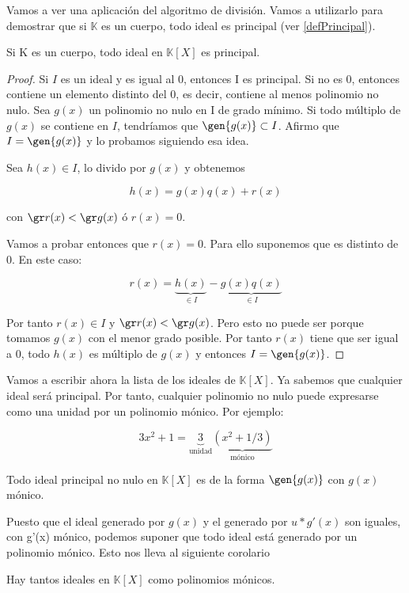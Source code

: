 \documentclass[nochap]{apuntes}
\begin{document}
Vamos a ver una aplicación del algoritmo de división. Vamos a utilizarlo para demostrar que si $\mathbb{K}$  es un cuerpo, todo ideal es principal (ver \ref{defPrincipal}).

\begin{theorem}
 Si K es un cuerpo, todo ideal en $\mathbb{K}[X]$ es principal.
\end{theorem}

\begin{proof}
  Si $I$ es un ideal y es igual al 0, entonces I es principal. Si no es 0, entonces contiene un elemento distinto del 0, es decir, contiene al menos polinomio no nulo. Sea $g(x)$ un polinomio no nulo en I de grado mínimo. Si todo múltiplo de $g(x)$ se contiene en $I$, tendríamos que $\gen{g(x)} \subset I$. Afirmo que $I=\gen{g(x)}$ y lo probamos siguiendo esa idea.

 Sea $h(x)\in I$, lo divido por $g(x)$ y obtenemos

 \[ h(x)=g(x)q(x)+r(x) \]

 con $\gr r(x) < \gr g(x)$ ó $r(x)=0$.

 Vamos a probar entonces que $r(x)=0$. Para ello suponemos que es distinto de 0. En este caso:

 \[ r(x)=\underbrace{h(x)}_{\in I}-\underbrace{g(x)q(x)}_{\in I} \]

 Por tanto $r(x)\in I$ y $\gr r(x) < \gr g(x)$. Pero esto no puede ser porque tomamos $g(x)$ con el menor grado posible. Por tanto $r(x)$ tiene que ser igual a 0, todo $h(x)$ es múltiplo de $g(x)$ y entonces $I=\gen{g(x)}$.
\end{proof}

Vamos a escribir ahora la lista de los ideales de $\mathbb{K}[X]$. Ya sabemos que cualquier ideal será principal. Por tanto, cualquier polinomio no nulo puede expresarse como una unidad por un polinomio mónico. Por ejemplo:

 \[3x^{2}+1=\underbrace{3}_{\text{unidad}}\underbrace{(x^{2}+1/3)}_{\text{mónico}}\]

\begin{lemma}
 Todo ideal principal no nulo en $\mathbb{K}[X]$  es de la forma $\gen{g(x)}$ con $g(x)$  mónico.
\end{lemma}

Puesto que el ideal generado por $g(x)$ y el generado por $u*g'(x)$ son iguales, con g'(x) mónico, podemos suponer que todo ideal
está generado por un polinomio mónico. Esto nos lleva al siguiente corolario

\begin{corol}
 Hay tantos ideales en $\mathbb{K}[X]$  como polinomios mónicos.
\end{corol}
\end{document}

